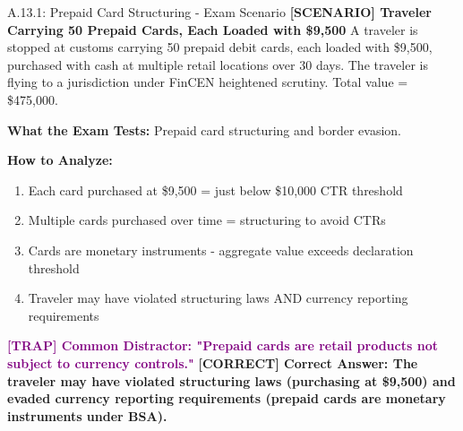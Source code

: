 \documentclass[11pt,a4paper]{beamer}
\newcommand{\trap}[1]{\textcolor{purple}{\textbf{[TRAP] #1}}}
\newcommand{\correct}[1]{\textcolor{green!50!black}{\textbf{[CORRECT] #1}}}
\newcommand{\scenario}[1]{\textcolor{blue!70!black}{\textbf{[SCENARIO] #1}}}
\begin{document}
	\begin{frame}{A.13.1: Prepaid Card Structuring - Exam Scenario}
		\scenario{Traveler Carrying 50 Prepaid Cards, Each Loaded with \$9,500}
		A traveler is stopped at customs carrying 50 prepaid debit cards, each loaded with \$9,500, purchased with cash at multiple retail locations over 30 days. The traveler is flying to a jurisdiction under FinCEN heightened scrutiny. Total value = \$475,000.
		
		\vspace{0.1cm}
		\textbf{What the Exam Tests:} Prepaid card structuring and border evasion.
		
		\vspace{0.1cm}
		\textbf{How to Analyze:}
		\begin{enumerate}
			\item Each card purchased at \$9,500 = just below \$10,000 CTR threshold
			\item Multiple cards purchased over time = structuring to avoid CTRs
			\item Cards are monetary instruments - aggregate value exceeds declaration threshold
			\item Traveler may have violated structuring laws AND currency reporting requirements
		\end{enumerate}
		
		\trap{Common Distractor: "Prepaid cards are retail products not subject to currency controls."}
		\correct{Correct Answer: The traveler may have violated structuring laws (purchasing at \$9,500) and evaded currency reporting requirements (prepaid cards are monetary instruments under BSA).}
	\end{frame}
	
	
\end{document}

